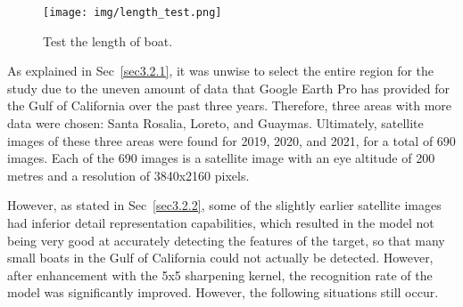 \begin{figure}[h!]
    \centering
    \texttt{[image: img/length\_test.png]}
    \caption{Test the length of boat.}
    \label{fig:length_test}
\end{figure}



As explained in Sec~\ref{sec3.2.1}, it was unwise to select the entire region for the study due to the uneven amount of data that Google Earth Pro has provided for the Gulf of California over the past three years. Therefore, three areas with more data were chosen: Santa Rosalia, Loreto, and Guaymas. Ultimately, satellite images of these three areas were found for 2019, 2020, and 2021, for a total of 690 images. Each of the 690 images is a satellite image with an eye altitude of 200 metres and a resolution of 3840x2160 pixels.

However, as stated in Sec~\ref{sec3.2.2}, some of the slightly earlier satellite images had inferior detail representation capabilities, which resulted in the model not being very good at accurately detecting the features of the target, so that many small boats in the Gulf of California could not actually be detected. However, after enhancement with the 5x5 sharpening kernel, the recognition rate of the model was significantly improved. However, the following situations still occur.


